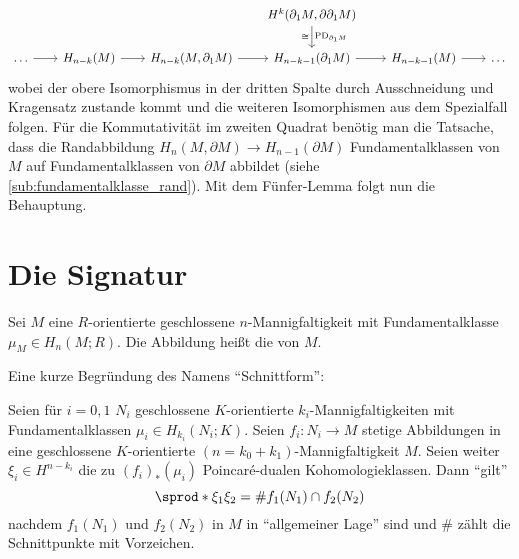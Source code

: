 \begin{beweis}[{name={\cite[Th.~3.43]{Hatcher}}}]
\[\begin{tikzcd}[column sep=2em]
			& & & H^k \enbrace*{\partial_1 M, \partial \partial_1 M} \dar["\PD_{\partial_1 M}","\cong"'] \\
			\ldots \rar & H_{n-k}(M) \rar & H_{n-k}(M,\partial_1 M) \rar & H_{n-k-1}(\partial_1 M) \rar & H_{n-k-1}(M) \rar &\ldots 
		\end{tikzcd}
	\]
	wobei der obere Isomorphismus in der dritten Spalte durch Ausschneidung und Kragensatz zustande kommt und die weiteren Isomorphismen aus dem Spezialfall folgen.
	Für die Kommutativität im zweiten Quadrat benötig man die Tatsache, dass die Randabbildung $H_n(M,\partial M) \to H_{n-1}(\partial M)$ Fundamentalklassen von $M$ auf Fundamentalklassen von $\partial M$ abbildet (siehe \cref{sub:fundamentalklasse_rand}).
	Mit dem Fünfer-Lemma folgt nun die Behauptung.
\end{beweis}
\newpage

\section{Die Signatur} %
\label{sec:10}

\begin{definition}[{name=[Schnittform]}]
	Sei $M$ eine $R$-orientierte geschlossene $n$-Mannigfaltigkeit mit Fundamentalklasse $\mu_M \in H_n(M;R)$.
	Die Abbildung
	heißt die  von $M$. 
\end{definition}

\begin{bemerkung}[{name=[Begründung des Namens \enquote{Schnittform}]}]
	Eine kurze Begründung des Namens \enquote{Schnittform}:
	
	Seien für $i=0,1$ $N_i$ geschlossene $K$-orientierte $k_i$-Mannigfaltigkeiten mit Fundamentalklassen $\mu_i \in H_{k_i}(N_i;K)$.
	Seien $f_i \colon N_i \to M$ stetige Abbildungen in eine geschlossene $K$-orientierte $(n=k_0+k_1)$-Mannigfaltigkeit $M$.
	Seien weiter $\xi_i \in H^{n-{k_i}}$ die zu $(f_i)_*(\mu_i)$ Poincaré-dualen Kohomologieklassen. Dann \enquote{gilt}
	\[
		\sprod*{\xi_1}{\xi_2} = \# f_1(N_1) \cap f_2(N_2)
	\]
	nachdem $f_1(N_1)$ und $f_2(N_2)$ in $M$ in \enquote{allgemeiner Lage} sind und $\#$ zählt die Schnittpunkte mit Vorzeichen.
\end{bemerkung}

